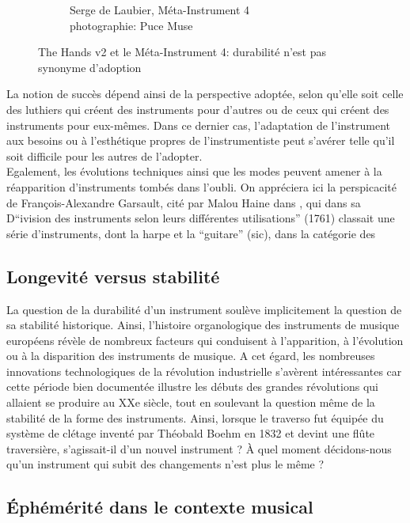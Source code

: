 \begin{figure}[!htbp]
{\begin{subfigure}[b]{.5\textwidth}
			\caption{Serge de Laubier, Méta-Instrument 4\\ photographie: Puce Muse}
			\label{fig:ephemeral:DeLaubier_MI4}
		\end{subfigure}%
	}
	\caption{The Hands v2 et le Méta-Instrument 4: durabilité n'est pas synonyme d'adoption}
\end{figure}

\indent La notion de succès dépend ainsi de la perspective adoptée, selon qu'elle soit celle des luthiers qui créent des instruments pour d'autres ou de ceux qui créent des instruments pour eux-mêmes. Dans ce dernier cas, l'adaptation de l'instrument aux besoins ou à l'esthétique propres de l'instrumentiste peut s'avérer telle qu'il soit difficile pour les autres de l'adopter.\\
\indent Egalement, les évolutions techniques ainsi que les modes peuvent amener à la réapparition d'instruments tombés dans l'oubli. On appréciera ici la perspicacité de François-Alexandre Garsault, cité par Malou Haine dans \cite{haine_les_2018}, qui dans sa D``ivision des instruments selon leurs différentes utilisations'' (1761) classait une série d'instruments, dont la harpe et la ``guitare'' (sic), dans la catégorie des 


\subsection{Longevité versus stabilité}
\label{sec:ephemeral:longevity_stability}
La question de la durabilité d'un instrument soulève implicitement la question de sa stabilité historique. Ainsi, l'histoire organologique des instruments de musique européens révèle de nombreux facteurs qui conduisent à l'apparition, à l'évolution ou à la disparition des instruments de musique. A cet égard, les nombreuses innovations technologiques de la révolution industrielle s'avèrent intéressantes car cette période bien documentée illustre les débuts des grandes révolutions qui allaient se produire au XXe siècle, tout en soulevant la question même de la stabilité de la forme des instruments. Ainsi, lorsque le traverso fut équipée du système de clétage inventé par Théobald Boehm en 1832 et devint une flûte traversière, s'agissait-il d'un nouvel instrument ? À quel moment décidons-nous qu'un instrument qui subit des changements n'est plus le même ?

\subsection{Éphémérité dans le contexte musical}
\label{sec:ephemeral:ephemerality_in_musical_context}

